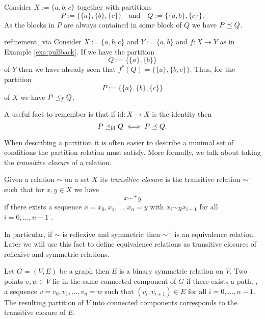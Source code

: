 \begin{example}{}{}
Consider $X := \{a,b,c\}$ together with partitions
$$
P := \{\{a\}, \{b\}, \{c\}\} \quad \text{and} \quad Q := \{\{a,b\}, \{c\}\}.
$$
As the blocks in $P$ are always contained in some block of $Q$ we have $P \preceq Q$.
\end{example}

\begin{example}{}{refinement_via}
Consider $X := \{a,b,c\}$ and $Y := \{a,b\}$ and $f\colon X \to Y$ as in Example \ref{exa:pullback}. If we have the partition 
$$
Q := \{\{a\}, \{b\}\}
$$
of $Y$ then we have already seen that $f^*(Q) = \{\{a\}, \{b,c\}\}$. Thus, for the partition
$$
P := \{\{a\}, \{b\}, \{c\}\}
$$
of $X$ we have $P \preceq_f Q$.
\end{example}

A useful fact to remember is that if $\mathrm{id}\colon X \to X$ is the identity then
\begin{equation}
    \label{eq:refinement_via_identity}
    P \preceq_{\mathrm{id}} Q \iff P \preceq Q.
\end{equation}

When describing a partition it is often easier to describe a minimal set of conditions the partition relation must satisfy. More formally, we talk about taking the \emph{transitive closure} of a relation.

\begin{definition}{}{}
    Given a relation $\sim$ on a set $X$ its \emph{transitive closure} is the transitive relation $\sim^+$ such that for $x,y \in X$ we have
    $$
    x \sim^+ y
    $$
    if there exists a sequence $x = x_0, x_1, \dots, x_n = y$ with $x_i \sim_R x_{i+1}$ for all $i = 0, \dots, n-1$ \cite[p.337]{Lidl1997-kc}.
\end{definition}

In particular, if $\sim$ is reflexive and symmetric then $\sim^+$ is an equivalence relation.
Later we will use this fact to define equivalence relations as transitive closures of reflexive and symmetric relations.

\begin{example}{}{}
Let $G = (V,E)$ be a graph then $E$ is a binary symmetric relation on $V$. Two points $v,w \in V$ lie in the same connected component of $G$ if there exists a path, \ie, a sequence $v =v_0, v_1, \dots, v_n = w$ such that $(v_i, v_{i+1}) \in E$ for all $i = 0, \dots, n-1$. The resulting partition of $V$ into connected components corresponds to the transitive closure of $E$.
\end{example}

